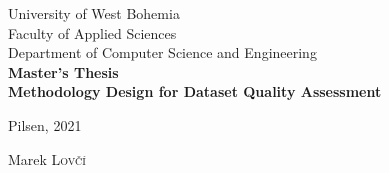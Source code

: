 \linespread{1}

\begin{titlepage}

    \newcommand{\HRule}{\rule{\linewidth}{0.5mm}} %

    \center{} %


    {\LARGE University of West Bohemia}\\[.5cm] %
    {\LARGE Faculty of Applied Sciences}\\[.5cm] %
    {\LARGE Department of Computer Science and Engineering}\\[4cm] %

    {\Huge \bfseries Master's Thesis}\\[2cm] %


    {\Huge \bfseries Methodology Design for Dataset Quality Assessment}\\[11cm] %


    \begin{minipage}[t]{0.49\textwidth}
        \begin{flushleft}
            \Large Pilsen, 2021
        \end{flushleft}
    \end{minipage}
    \begin{minipage}[t]{0.49\textwidth}
        \begin{flushright}
            \Large Marek \textsc{Lovčí}
        \end{flushright}
    \end{minipage}\\ %


\end{titlepage}
